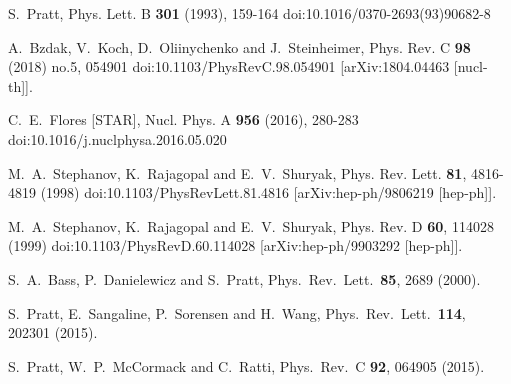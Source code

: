 \begin{thebibliography}{99}
S.~Pratt,
Phys. Lett. B \textbf{301} (1993), 159-164
doi:10.1016/0370-2693(93)90682-8

A.~Bzdak, V.~Koch, D.~Oliinychenko and J.~Steinheimer,
Phys. Rev. C \textbf{98} (2018) no.5, 054901
doi:10.1103/PhysRevC.98.054901
[arXiv:1804.04463 [nucl-th]].

C.~E.~Flores [STAR],
Nucl. Phys. A \textbf{956} (2016), 280-283
doi:10.1016/j.nuclphysa.2016.05.020

M.~A.~Stephanov, K.~Rajagopal and E.~V.~Shuryak,
Phys. Rev. Lett. \textbf{81}, 4816-4819 (1998)
doi:10.1103/PhysRevLett.81.4816
[arXiv:hep-ph/9806219 [hep-ph]].

M.~A.~Stephanov, K.~Rajagopal and E.~V.~Shuryak,
Phys. Rev. D \textbf{60}, 114028 (1999)
doi:10.1103/PhysRevD.60.114028
[arXiv:hep-ph/9903292 [hep-ph]].

  S.~A.~Bass, P.~Danielewicz and S.~Pratt,
  Phys.\ Rev.\ Lett.\  {\bf 85}, 2689 (2000).







  S.~Pratt, E.~Sangaline, P.~Sorensen and H.~Wang,
  Phys.\ Rev.\ Lett.\  {\bf 114}, 202301 (2015).
  
	
  S.~Pratt, W.~P.~McCormack and C.~Ratti,
  Phys.\ Rev.\ C {\bf 92}, 064905 (2015).
  

\end{thebibliography}
